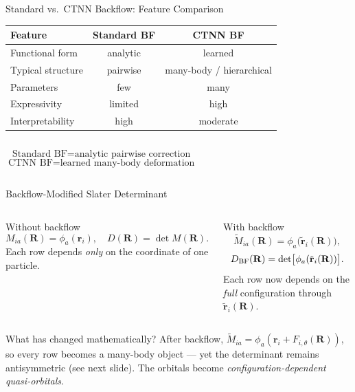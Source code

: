 \documentclass[aspectratio=169,10pt]{beamer}
\begin{document}
\begin{frame}{Standard vs.\ CTNN Backflow: Feature Comparison}
  \renewcommand{\arraystretch}{1.3}
  \begin{center}
  \begin{tabular}{p{3.8cm}cc}
    \toprule
    \textbf{Feature} & \textbf{Standard BF} & \textbf{CTNN BF} \\
    \midrule
    Functional form   & analytic             & learned \\
    Typical structure & pairwise             & many-body / hierarchical \\
    Parameters        & few                  & many \\
    Expressivity      & limited              & high \\
    Interpretability  & high                 & moderate \\
    \bottomrule
  \end{tabular}
  \end{center}

  \vspace{0.4cm}
  \begin{columns}[T]
      \[
        \boxed{\text{Standard BF}=\text{analytic pairwise correction}}
      \]
      \[
        \boxed{\text{CTNN BF}=\text{learned many-body deformation}}
      \]
  \end{columns}
\end{frame}


\begin{frame}{Backflow-Modified Slater Determinant}
  \begin{columns}[T]
      \begin{block}{Without backflow}
        \[
          M_{ia}(\mathbf{R})=\phi_a(\mathbf{r}_i),\quad
          D(\mathbf{R})=\det M(\mathbf{R}).
        \]
        Each row depends \emph{only} on the coordinate of one particle.
      \end{block}
      \begin{alertblock}{With backflow}
        \[
          \widetilde{M}_{ia}(\mathbf{R})
          =\phi_a\!\bigl(\tilde{\mathbf{r}}_i(\mathbf{R})\bigr),
        \]
        \[
          D_{\rm BF}(\mathbf{R})
          =\det\bigl[\phi_a(\tilde{\mathbf{r}}_i(\mathbf{R}))\bigr].
        \]
        Each row now depends on the \emph{full} configuration through
        $\tilde{\mathbf{r}}_i(\mathbf{R})$.
      \end{alertblock}
  \end{columns}
  \vspace{0.4cm}
  \begin{block}{What has changed mathematically?}
    After backflow, $\widetilde{M}_{ia}=\phi_a(\mathbf{r}_i+F_{i,\theta}(\mathbf{R}))$,
    so every row becomes a many-body object — yet the determinant remains
    antisymmetric (see next slide). The orbitals become
    \emph{configuration-dependent quasi-orbitals}.
  \end{block}
\end{frame}
\end{document}
